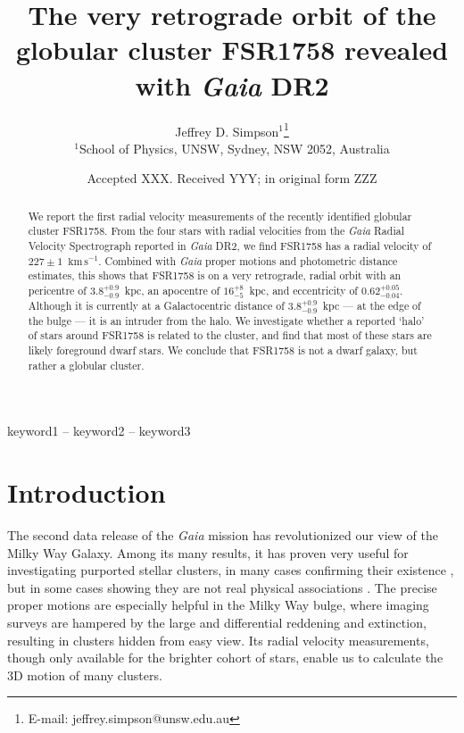 \documentclass[fleqn,usenatbib,letters]{mnras}
\title[FSR1758 orbit]{The very retrograde orbit of the globular cluster FSR1758 revealed with \textit{Gaia} DR2}
\author[Simpson et al.]{
Jeffrey D. Simpson$^{1}$\thanks{E-mail: jeffrey.simpson@unsw.edu.au}
\\
$^{1}$School of Physics, UNSW, Sydney, NSW 2052, Australia
}
\date{Accepted XXX. Received YYY; in original form ZZZ}
\newcommand{\kms}{~\ensuremath{\textrm{km}\,\textrm{s}^{-1}}}
\begin{document}
\label{firstpage}
\pagerange{\pageref{firstpage}--\pageref{lastpage}}
\maketitle

\begin{abstract}
We report the first radial velocity measurements of the recently identified globular cluster FSR1758. From the four stars with radial velocities from the \textit{Gaia} Radial Velocity Spectrograph reported in \textit{Gaia} DR2, we find FSR1758 has a radial velocity of $227\pm1$\kms. Combined with \textit{Gaia} proper motions and photometric distance estimates, this shows that FSR1758 is on a very retrograde, radial orbit with an pericentre of $3.8_{-0.9}^{+0.9}$~kpc, an apocentre of $16_{-5}^{+8}$~kpc, and eccentricity of $0.62_{-0.04}^{+0.05}$. Although it is currently at a Galactocentric distance of $3.8_{-0.9}^{+0.9}$~kpc --- at the edge of the bulge --- it is an intruder from the halo. We investigate whether a reported `halo' of stars around FSR1758 is related to the cluster, and find that most of these stars are likely foreground dwarf stars. We conclude that FSR1758 is not a dwarf galaxy, but rather a globular cluster.
\end{abstract}

\begin{keywords}
keyword1 -- keyword2 -- keyword3
\end{keywords}



\section{Introduction} \label{sec:intro}
The second data release of the \textit{Gaia} mission \citep{GaiaCollaboration:2018io} has revolutionized our view of the Milky Way Galaxy. Among its many results, it has proven very useful for investigating purported stellar clusters, in many cases confirming their existence \citep[e.g.,][]{Simpson:2017ex,Soubiran2018,Cantat-Gaudin2018}, but in some cases showing they are not real physical associations \citep[e.g.,][]{Kos:2018we}. The precise proper motions are especially helpful in the Milky Way bulge, where imaging surveys are hampered by the large and differential reddening and extinction, resulting in clusters hidden from easy view. Its radial velocity measurements, though only available for the brighter cohort of stars, enable us to calculate the 3D motion of many clusters.
\end{document}
